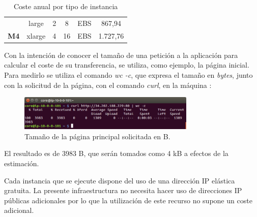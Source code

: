 \begin{table}
\begin{tabular}{cccccc}
\multicolumn{1}{|c|}{\cellcolor[HTML]{EFEFEF}}                              & \multicolumn{1}{c|}{large}                                   & \multicolumn{1}{c|}{2}                                    & \multicolumn{1}{c|}{8}                                                                                      & \multicolumn{1}{c|}{EBS}                                                                                          & \multicolumn{1}{c|}{867,94}                                                                             \\ \cline{2-6} 
\multicolumn{1}{|c|}{\multirow{-2}{*}{\cellcolor[HTML]{EFEFEF}\textbf{M4}}} & \multicolumn{1}{c|}{xlarge}                                  & \multicolumn{1}{c|}{4}                                    & \multicolumn{1}{c|}{16}                                                                                     & \multicolumn{1}{c|}{EBS}                                                                                          & \multicolumn{1}{c|}{1.727,76}                                                                           \\ \hline
                                                                          
\end{tabular}
\caption{Coste anual por tipo de instancia}
\end{table}

Con la intención de conocer el tamaño de una petición a la aplicación para calcular el coste de su transferencia, se utiliza, como ejemplo, la página inicial. Para medirlo se utiliza el comando \textit{wc -c}, que expresa el tamaño en \textit{bytes}, junto con la solicitud de la página, con el comando \textit{curl}, en la máquina :

\begin{figure}[hp]
\centering
\includegraphics[width=0.75\textwidth]{images/figures/curl-wc.png}
\caption{Tamaño de la página principal solicitada en B.}
\end{figure}

El resultado es de 3983 B, que serán tomados como 4 kB a efectos de la estimación.

Cada instancia que se ejecute dispone del uso de una dirección IP elástica gratuita. La presente infraestructura no necesita hacer uso de direcciones IP públicas adicionales por lo que la utilización de este recurso no supone un coste adicional.

